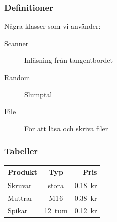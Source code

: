 \begin{frame}[fragile,t]
  \frametitle{Definitioner}
  \vspace{2em}


  \begin{exlatex}
Några klasser som vi använder:

\begin{description}
  \item[Scanner] Inläsning från tangentbordet
  \item[Random] Slumptal
  \item[File] För att läsa och skriva filer
\end{description}
  \end{exlatex}

\end{frame}

\begin{frame}[fragile,t]
  \frametitle{Tabeller}
  \vspace{2em}
  
  \begin{itemize}
  \end{itemize}

  \begin{exlatex}
\begin{tabular}{lcr}
  Produkt & Typ    & Pris    \\
  \hline
  Skruvar & stora  & 0.18~kr \\
  Muttrar & M16    & 0.38~kr \\
  Spikar  & 12~tum & 0.12~kr
\end{tabular}
  \end{exlatex}

\end{frame}

